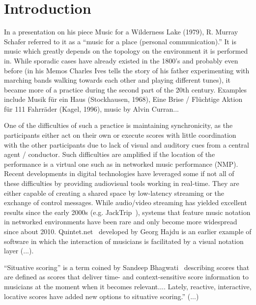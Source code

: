 
\section{Introduction}\label{sec:intro}

%
%
%

In a presentation on his piece Music for a Wilderness Lake (1979), R. Murray Schafer referred to it as a ``music for a place (personal communication).'' It is music which greatly depends on the topology on the environment it is performed in. While sporadic cases have already existed in the 1800's and probably even before (in his Memos Charles Ives tells the story of his father experimenting with marching bands walking towards each other and playing different tunes), it became more of a practice during the second part of the 20th century. Examples include Musik f\"ur ein Haus (Stockhausen, 1968), Eine Brise / Fl\"uchtige Aktion f\"ur 111 Fahrr\"ader (Kagel, 1996), music by Alvin Curran...

One of the difficulties of such a practice is maintaining synchronicity, as the participants either act on their own or execute scores with little coordination with the other participants due to lack of visual and auditory cues from a central agent / conductor. Such difficulties are amplified if the location of the performance is a virtual one such as in networked music performance (NMP). Recent developments in digital technologies have leveraged some if not all of these difficulties by providing audiovisual tools working in real-time. They are either capable of creating a shared space by low-latency streaming or the exchange of control messages. While audio/video streaming has yielded excellent results since the early 2000s (e.g. JackTrip~\cite{caceres2010jacktrip}), systems that feature music notation in networked environments have been rare and only become more widespread since about 2010. Quintet.net~\cite{hajdu2005quintet} developed by Georg Hajdu is an earlier example of software in which the interaction of musicians is facilitated by a visual notation layer (...).

``Situative scoring'' is a term coined by Sandeep Bhagwati~\cite{bhagwati2017vexations} describing scores that are defined as scores that deliver time- and context-sensitive score information to musicians at the moment when it becomes relevant.... Lately, reactive, interactive, locative scores have added new options to situative scoring.'' (...)

